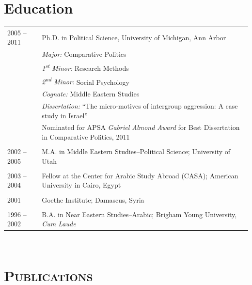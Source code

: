 \documentclass[10pt]{article}
\begin{document}
\section{Education}
\begin{flushleft}
\begin{tabular}{l l}
	
2005 -- 2011 & {\sc Ph.D. in Political Science,} University of Michigan, Ann Arbor\\
& {\em Major:} Comparative Politics\\
& {\em 1\textsuperscript{st} Minor:} Research Methods\\
& {\em 2\textsuperscript{nd} Minor:} Social Psychology\\
& {\em Cognate:} Middle Eastern Studies\\
& {\em Dissertation:} ``The micro-motives of intergroup aggression: A case study in Israel''\\
& Nominated for APSA \textit{Gabriel Almond Award} for Best Dissertation in Comparative Politics, 2011\\
&\\
2002 -- 2005 & M.A. in Middle Eastern Studies--Political Science; University of Utah\\
&\\
2003 -- 2004 & Fellow at the Center for Arabic Study Abroad (CASA); American University in Cairo, Egypt\\
&\\
2001 & Goethe Institute; Damascus, Syria\\
&\\
1996 -- 2002 & B.A. in Near Eastern Studies--Arabic; Brigham Young University, {\em Cum Laude}\\

\end{tabular}\ \\[18pt]
\end{flushleft}





\section{\textsc{Publications}}
\end{document}
